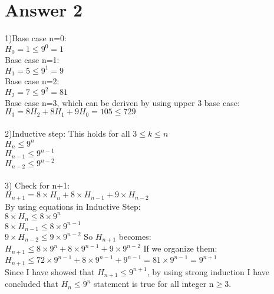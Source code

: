 \documentclass[12pt]{article}
\begin{document}
\section*{Answer 2}
1)Base case n=0:\\
$H_0=1\leq9^0=1$\\
Base case n=1:\\
$H_1=5\leq9^1=9$\\
Base case n=2:\\
$H_2=7\leq9^2=81$\\
Base case n=3, which can be deriven by using upper 3 base case:\\
$H_3=8H_{2}+8H_{1}+9H_{0}=105\leq729$\\
\\2)Inductive step: This holds for all $3\leq k \leq n$\\
$H_n\leq 9^n$\\
$H_{n-1}\leq 9^{n-1}$\\
$H_{n-2}\leq 9^{n-2}$\\\\
3) Check for n+1:\\
$H_{n+1}=8\times H_{n}+8\times H_{n-1}+9\times H_{n-2}$\\
By using equations in Inductive Step:\\
$8\times H_n\leq8\times 9^n$\\
$8\times H_{n-1}\leq 8\times  9^{n-1}$\\
$9\times H_{n-2}\leq 9\times  9^{n-2}$ So $H_{n+1}$ becomes:\\
$H_{n+1}\leq 8\times 9^n+ 8\times  9^{n-1}+ 9\times  9^{n-2}$ If we organize them:\\
$H_{n+1}\leq 72\times 9^{n-1}+ 8\times  9^{n-1}+ 9^{n-1}=81\times 9^{n-1}=9^{n+1}$\\
Since I have showed that $H_{n+1} \leq 9^{n+1}$, by using strong induction I have concluded that $H_{n} \leq 9^{n}$ statement is true for all integer n$\geq 3$.
\end{document}
